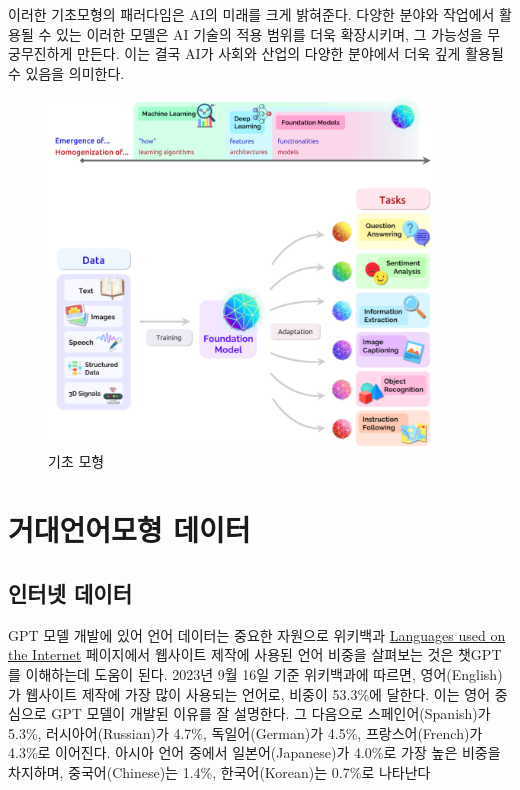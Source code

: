 \documentclass[
  letterpaper,
]{book}
\begin{document}
이러한 기초모형의 패러다임은 AI의 미래를 크게 밝혀준다. 다양한 분야와
작업에서 활용될 수 있는 이러한 모델은 AI 기술의 적용 범위를 더욱
확장시키며, 그 가능성을 무궁무진하게 만든다. 이는 결국 AI가 사회와
산업의 다양한 분야에서 더욱 깊게 활용될 수 있음을 의미한다.

\begin{figure}

{\centering \includegraphics[width=4.0625in,height=\textheight]{images/foundation_model.png}

}

\caption{기초 모형}

\end{figure}

\hypertarget{uxac70uxb300uxc5b8uxc5b4uxbaa8uxd615-uxb370uxc774uxd130}{%
\section{거대언어모형
데이터}\label{uxac70uxb300uxc5b8uxc5b4uxbaa8uxd615-uxb370uxc774uxd130}}

\hypertarget{uxc778uxd130uxb137-uxb370uxc774uxd130}{%
\subsection{인터넷 데이터}\label{uxc778uxd130uxb137-uxb370uxc774uxd130}}

GPT 모델 개발에 있어 언어 데이터는 중요한 자원으로 위키백과
\href{https://en.wikipedia.org/wiki/Languages_used_on_the_Internet}{Languages
used on the Internet} 페이지에서 웹사이트 제작에 사용된 언어 비중을
살펴보는 것은 챗GPT를 이해하는데 도움이 된다. 2023년 9월 16일 기준
위키백과에 따르면, 영어(English)가 웹사이트 제작에 가장 많이 사용되는
언어로, 비중이 53.3\%에 달한다. 이는 영어 중심으로 GPT 모델이 개발된
이유를 잘 설명한다. 그 다음으로 스페인어(Spanish)가 5.3\%,
러시아어(Russian)가 4.7\%, 독일어(German)가 4.5\%, 프랑스어(French)가
4.3\%로 이어진다. 아시아 언어 중에서 일본어(Japanese)가 4.0\%로 가장
높은 비중을 차지하며, 중국어(Chinese)는 1.4\%, 한국어(Korean)는 0.7\%로
나타난다
\end{document}
